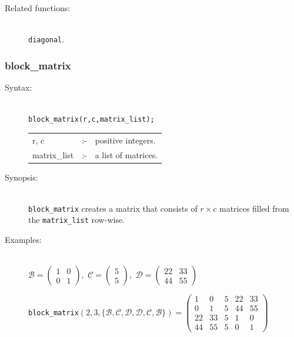 {\begin{description}
\item[Related functions:]\mbox{}\\
 \texttt{diagonal}.
\end{description}


\subsubsection{block\_matrix}
\label{linalg:block_matrix}
\hypertarget{operator:BLOCK_MATRIX}{}

\begin{description}

\item[Syntax:]\mbox{}\\
\texttt{block\_matrix(r,c,matrix\_list);}\\[2mm]
\begin{tabular}{l l l}
r, c         &:-& positive integers. \\
matrix\_list &:-& a list of matrices.
\end{tabular}

\item[Synopsis:]\mbox{}\\
\texttt{block\_matrix} creates a matrix that consists of $r\times c$ matrices
filled from the \texttt{matrix\_list} row-wise.

\item[Examples:]\mbox{}\\
  \(\mathcal{B} = \begin{pmatrix} 1 & 0 \\ 0 & 1 \end{pmatrix}, \,\,
  \mathcal{C} = \begin{pmatrix} 5 \\ 5 \end{pmatrix}, \,\,
  \mathcal{D} = \begin{pmatrix} 22 & 33 \\ 44 & 55 \end{pmatrix}\)

  \texttt{block\_matrix}\((2,3,\{\mathcal{B,C,D,D,C,B}\})  =
  \begin{pmatrix} 1 & 0 & 5 & 22 & 33 \\ 0 & 1 & 5 & 44 & 55 \\
    22 & 33 & 5 & 1 & 0 \\ 44 & 55 & 5 & 0 & 1 \end{pmatrix}\)
\end{description}


}
